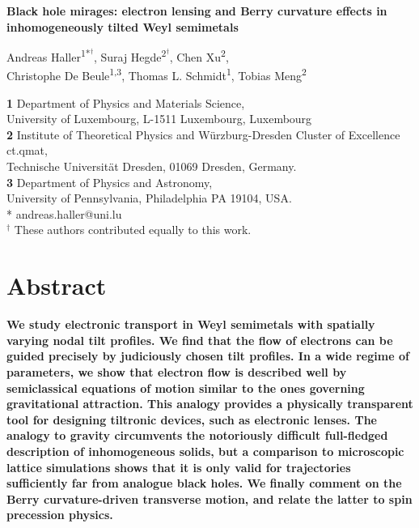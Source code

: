 \documentclass[submission, Phys]{SciPost}
\begin{document}
\begin{center}{\Large \textbf{
Black hole mirages: electron lensing and Berry curvature effects in inhomogeneously tilted Weyl semimetals}
}\end{center}

\begin{center}
Andreas Haller\textsuperscript{1*$^\dag$},
Suraj Hegde\textsuperscript{2$^\dag$},
Chen Xu\textsuperscript{2},\\
Christophe De Beule\textsuperscript{1,3},
Thomas L. Schmidt\textsuperscript{1},
Tobias Meng\textsuperscript{2}
\end{center}

\begin{center}
{\bf 1} Department of Physics and Materials Science,\\
University of Luxembourg, L-1511 Luxembourg, Luxembourg
\\
{\bf 2 } Institute of Theoretical Physics and W\"urzburg-Dresden Cluster of Excellence ct.qmat,\\ Technische Universit\"at Dresden, 01069 Dresden, Germany.
\\
{\bf 3 } Department of Physics and Astronomy,\\ University of Pennsylvania, Philadelphia PA 19104, USA.
\\
\medskip
* andreas.haller@uni.lu\\
$^\dag$ These authors contributed equally to this work.
\end{center}

\begin{center}
\end{center}

\section*{Abstract}
{\bf We study electronic transport in Weyl semimetals with spatially varying nodal tilt profiles. We find that the flow of electrons can be guided precisely by judiciously chosen tilt profiles. In a wide regime of parameters, we show that electron flow is described well by semiclassical equations of motion similar to the ones governing gravitational attraction. This analogy provides a physically transparent tool for designing tiltronic devices, such as electronic lenses. The analogy to gravity circumvents the notoriously difficult full-fledged description of inhomogeneous solids, but a comparison to microscopic lattice simulations shows that it is only valid for trajectories sufficiently far from analogue black holes. We finally comment on the Berry curvature-driven transverse motion, and relate the latter to spin precession physics.}
\end{document}
